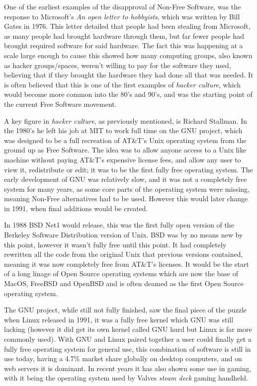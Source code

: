 \documentclass[a4paper,12pt]{article}
\begin{document}
{One of the earliest examples of the disapproval of Non-Free Software, was the response to Microsoft's 
\textit{An open letter to hobbyists}, which was written by Bill Gates in 1976. This letter detailed 
that people had been stealing from Microsoft, as many people had brought hardware through 
them, but far fewer people had brought required software for said hardware. The fact this was happening 
at a scale large enough to cause this showed how many computing groups, also known as hacker groups/spaces, 
weren't willing to pay for the software they used, believing that if they brought the hardware they had done 
all that was needed\cite{OPENletter}. It is often believed that this is one of the first examples 
of \textit{hacker culture}, which would become more common into the 80's and 90's, and was the 
starting point of the current Free Software movement.

A key figure in \textit{hacker culture}, as previously mentioned, is Richard Stallman. In the 
 1980's he left his job at MIT to work full time on the GNU project, which was designed
to be a full recreation of AT\&T's Unix operating system from the ground up as Free Software. 
The idea was to allow anyone access to a Unix like machine without paying AT\&T's expensive license 
fees, and allow any user to view it, redistribute or edit; it was to be the first fully free 
operating system. The early development of GNU was relatively slow, and it was not a completely free 
system for many years, as some core parts of the operating system were missing, meaning Non-Free 
alternatives had to be used. However this would later change in 1991, when final additions would
be created.

In 1988 BSD Net1 would release\cite{BSDnet1}, this was the first fully open version of the Berkeley 
Software Distribution version of Unix. BSD was by no means new by this point, however it wasn't 
fully free until this point. It had completely rewritten all the code from the original 
Unix that previous versions contained, meaning it was now completely free from AT\&T's licenses.
It would be the start of a long linage of Open Source operating systems which are now the base
of MacOS, FreeBSD and OpenBSD and is often deamed as the first Open Source operating system.

The GNU project, while still not fully finished, saw the final piece of the puzzle when 
Linux\cite{LINUX} released in 1991, it was a fully free kernel which GNU was still lacking (however 
it did get its own kernel called GNU hurd but Linux is far more commonly used). With GNU and Linux 
paired together a user could finally get a fully free operating system for general use, this 
combination of software is still in use today, having a 4.7\% market share globally on desktop
computers\cite{LINUXmarket}, and on web servers it is dominant. In recent years it has also shown
some use in gaming, with it being the operating system used by Valves \textit{steam deck} gaming 
handheld\cite{STEAMdeck}.

}
\end{document}
